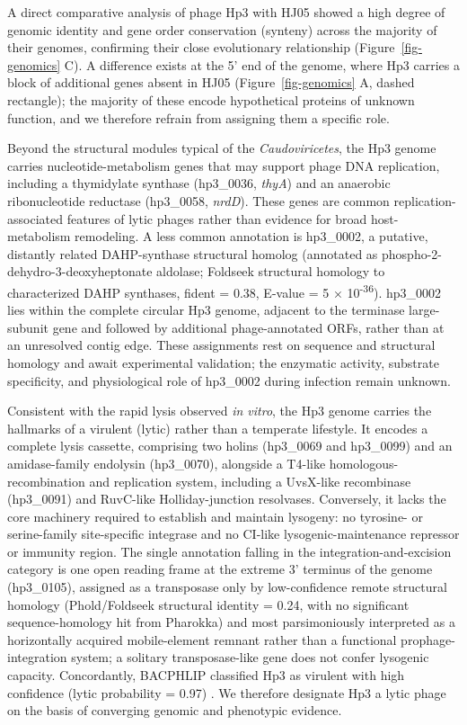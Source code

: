 \documentclass[11pt,a4paper]{article}
\begin{document}
A direct comparative analysis of phage Hp3 with HJ05 showed a high
degree of genomic identity and gene order conservation (synteny) across
the majority of their genomes, confirming their close evolutionary
relationship (Figure~\ref{fig-genomics} C). A difference exists
at the 5' end of the genome, where Hp3 carries a block of additional
genes absent in HJ05 (Figure~\ref{fig-genomics} A, dashed rectangle);
the majority of these encode hypothetical proteins of unknown function,
and we therefore refrain from assigning them a specific role.

Beyond the structural modules typical of the \emph{Caudoviricetes}, the
Hp3 genome carries nucleotide-metabolism genes that may support phage
DNA replication, including a thymidylate synthase (hp3\_0036,
\emph{thyA}) and an anaerobic ribonucleotide reductase (hp3\_0058,
\emph{nrdD}). These genes are common replication-associated features of
lytic phages rather than evidence for broad host-metabolism remodeling.
A less common annotation is hp3\_0002, a putative, distantly related
DAHP-synthase structural homolog (annotated as
phospho-2-dehydro-3-deoxyheptonate aldolase; Foldseek structural
homology to characterized DAHP synthases, fident = 0.38, E-value = 5 ×
10\textsuperscript{-36}). hp3\_0002 lies within the complete circular
Hp3 genome, adjacent to the terminase large-subunit gene and followed by
additional phage-annotated ORFs, rather than at an unresolved contig
edge. These assignments rest on sequence and structural homology and
await experimental validation; the enzymatic activity, substrate
specificity, and physiological role of hp3\_0002 during infection remain
unknown.

Consistent with the rapid lysis observed \emph{in vitro}, the Hp3 genome
carries the hallmarks of a virulent (lytic) rather than a temperate
lifestyle. It encodes a complete lysis cassette, comprising two holins (hp3\_0069 and
hp3\_0099) and an amidase-family endolysin (hp3\_0070), alongside a
T4-like homologous-recombination and replication system, including a
UvsX-like recombinase (hp3\_0091) and RuvC-like Holliday-junction
resolvases. Conversely, it lacks the core machinery required to establish
and maintain lysogeny: no tyrosine- or serine-family site-specific
integrase and no CI-like lysogenic-maintenance repressor or immunity
region. The single annotation falling in the integration-and-excision
category is one open reading frame at the extreme 3' terminus of the
genome (hp3\_0105), assigned as a transposase only by low-confidence remote
structural homology (Phold/Foldseek structural identity = 0.24, with no
significant sequence-homology hit from Pharokka) and most parsimoniously
interpreted as a horizontally acquired mobile-element remnant rather than a
functional prophage-integration system; a solitary transposase-like gene
does not confer lysogenic capacity. Concordantly, BACPHLIP classified Hp3
as virulent with high confidence (lytic probability = 0.97)
\citep{2021-BACPHLIP_Hockenberry}. We therefore designate Hp3 a lytic phage
on the basis of converging genomic and phenotypic evidence.
\end{document}
